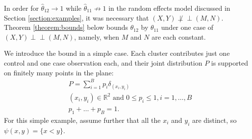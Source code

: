 \documentclass[12pt]{article}
\DeclareMathOperator{\AUC}{AUC}
\newcommand{\E}{E}
\renewcommand{\P}{P}
\newcommand{\cind}{\perp \!\!\! \perp}
\newcommand{\aucindiv}{\theta_{11}}%
\newcommand{\aucpop}{\theta_{12}}%
\newcommand{\aucindivhat}{\hat{\theta}_{11}}%
\newcommand{\aucpophat}{\hat{\theta}_{12}}%
\newcommand{\B}{B}
\newtheorem{lemma}[theorem]{Lemma}
\begin{document}



In order for $\aucpophat\to 1$ while $\aucindivhat\not\to 1$ in the
random effects model discussed in Section \ref{section:examples}, it
was necessary that $(X,Y)\not\cind (M,N)$. Theorem
\ref{theorem:bounds} below bounds $\aucpop$ by $\aucindiv$ under one case of $(X,Y)\cind (M,N)$, namely, when $M$ and $N$ are
each constant.


We introduce the bound in a simple case. Each cluster contributes
just one control and one case observation each, and their joint
distribution $\P$ is supported on finitely many points in the
plane:  %
\begin{align}
  &\P = \sum_{i=1}^\B p_i \delta_{(x_i,y_i)}\\
  &(x_i,y_i) \in \mathbb{R}^2 \text{ and } 0\le p_i\le 1,i=1,\ldots,B\\
  &p_1+\ldots+p_\B=1.
\end{align}
For this simple example, assume further that all the $x_i$ and $y_i$ are distinct, so $\psi(x,y)=\{x<y\}$.
\end{document}
